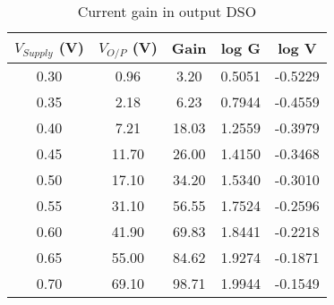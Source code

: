 \begin{table}[H]
    \centering
    \begin{tabular}{|c|c|c|c|c|}
    \hline
    $V_{Supply}$ (V) & $V_{O/P}$ (V) & Gain & log G & log V \\ \hline
    0.30 & 0.96 & 3.20 & 0.5051 & -0.5229 \\ 
    0.35 & 2.18 & 6.23 & 0.7944 & -0.4559 \\ 
    0.40 & 7.21 & 18.03 & 1.2559 & -0.3979 \\ 
    0.45 & 11.70 & 26.00 & 1.4150 & -0.3468 \\ 
    0.50 & 17.10 & 34.20 & 1.5340 & -0.3010 \\ 
    0.55 & 31.10 & 56.55 & 1.7524 & -0.2596 \\ 
    0.60 & 41.90 & 69.83 & 1.8441 & -0.2218 \\ 
    0.65 & 55.00 & 84.62 & 1.9274 & -0.1871 \\ 
    0.70 & 69.10 & 98.71 & 1.9944 & -0.1549 \\ \hline

\end{tabular}
\caption{Current gain in output DSO}
\end{table}